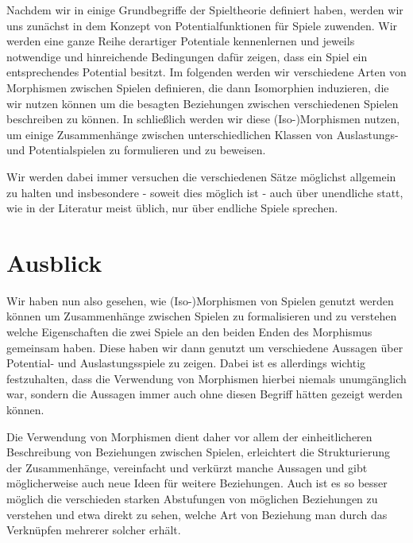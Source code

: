 \documentclass[a4paper,ngerman,11pt,bibliography=totoc]{scrartcl}
\theoremstyle{definition}
\theoremstyle{plain}
\theoremstyle{remark}
\begin{document}
Nachdem wir in  einige Grundbegriffe der Spieltheorie definiert haben, werden wir uns zunächst in  dem Konzept von Potentialfunktionen für Spiele zuwenden. Wir werden eine ganze Reihe derartiger Potentiale kennenlernen und jeweils notwendige und hinreichende Bedingungen dafür zeigen, dass ein Spiel ein entsprechendes Potential besitzt. Im folgenden  werden wir verschiedene Arten von Morphismen zwischen Spielen definieren, die dann Isomorphien induzieren, die wir nutzen können um die besagten Beziehungen zwischen verschiedenen Spielen beschreiben zu können. In  schließlich werden wir diese (Iso-)Morphismen nutzen, um einige Zusammenhänge zwischen unterschiedlichen Klassen von Auslastungs- und Potentialspielen zu formulieren und zu beweisen.

Wir werden dabei immer versuchen die verschiedenen Sätze möglichst allgemein zu halten und insbesondere - soweit dies möglich ist - auch über unendliche statt, wie in der Literatur meist üblich, nur über endliche Spiele sprechen.

\listoftodos






{}
\section*{Ausblick}

Wir haben nun also gesehen, wie (Iso-)Morphismen von Spielen genutzt werden können um Zusammenhänge zwischen Spielen zu formalisieren und zu verstehen welche Eigenschaften die zwei Spiele an den beiden Enden des Morphismus gemeinsam haben. Diese haben wir dann genutzt um verschiedene Aussagen über Potential- und Auslastungsspiele zu zeigen. Dabei ist es allerdings wichtig festzuhalten, dass die Verwendung von Morphismen hierbei niemals unumgänglich war, sondern die Aussagen immer auch ohne diesen Begriff hätten gezeigt werden können. 

Die Verwendung von Morphismen dient daher vor allem der einheitlicheren Beschreibung von Beziehungen zwischen Spielen, erleichtert die Strukturierung der Zusammenhänge, vereinfacht und verkürzt manche Aussagen und gibt möglicherweise auch neue Ideen für weitere Beziehungen. Auch ist es so besser möglich die verschieden starken Abstufungen von möglichen Beziehungen zu verstehen und etwa direkt zu sehen, welche Art von Beziehung man durch das Verknüpfen mehrerer solcher erhält.
\end{document}
